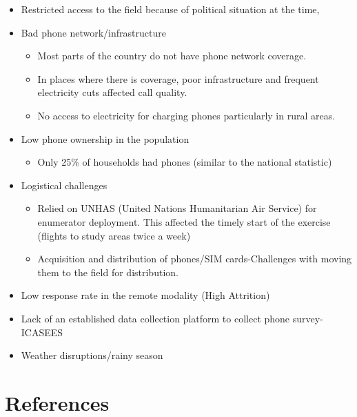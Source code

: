 \documentclass[11pt,harvard]{article}
\begin{document}
	\begin{itemize}[left=1.5em]
		\item[1.] Restricted access to the field because of political situation at the time,
		\item[2.] Bad phone network/infrastructure 
		\begin{itemize}[left=1.5em]
				\item[a.]	Most parts of the country do not have phone network coverage.
				\item[b.]	In places where there is coverage, poor infrastructure and frequent electricity cuts affected call quality.
				\item[c.]	No access to electricity for charging phones particularly in rural areas.
		\end{itemize}
		\item[3.] Low phone ownership in the population
		\begin{itemize}[left=1.5em]
			\item [a.] Only 25\% of households had phones (similar to the national statistic)
		\end{itemize}
		\item[4.] Logistical challenges
		\begin{itemize}[left=1.5em]
			\item [a.]	Relied on UNHAS (United Nations Humanitarian Air Service) for enumerator deployment. This affected the timely start of the exercise (flights to study areas twice a week)
			\item[b.]	Acquisition and distribution of phones/SIM cards-Challenges with moving them to the field for distribution.
		\end{itemize}
		\item[5.] Low response rate in the remote modality (High Attrition)
		\item[6.] Lack of an established data collection platform to collect phone survey-ICASEES 
		\item[7.] Weather disruptions/rainy season
	\end{itemize}
	
	
\pagebreak
	

\section{References}
\end{document}
